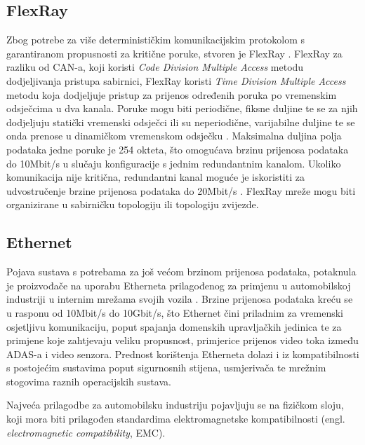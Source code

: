 \documentclass[times, utf8, diplomski, numeric]{fer}
\begin{document}
\subsection{FlexRay}
Zbog potrebe za više determinističkim komunikacijskim protokolom s garantiranom propusnosti za kritične poruke, stvoren je FlexRay \cite{nasser2023automotive}. FlexRay za razliku od CAN-a, koji koristi \textit{Code Division Multiple Access} metodu dodjeljivanja pristupa sabirnici, FlexRay koristi \textit{Time Division Multiple Access} metodu koja dodjeljuje pristup za prijenos određenih poruka po vremenskim odsječcima u dva kanala. Poruke mogu biti periodične, fiksne duljine te se za njih dodjeljuju statički vremenski odsječci ili su neperiodične, varijabilne duljine te se onda prenose u dinamičkom vremenskom odsječku \cite{nasser2023automotive}. Maksimalna duljina polja podataka jedne poruke je 254 okteta, što omogućava brzinu prijenosa podataka do 10Mbit/s u slučaju konfiguracije s jednim redundantnim kanalom. Ukoliko komunikacija nije kritična, redundantni kanal moguće je iskoristiti za udvostručenje brzine prijenosa podataka do 20Mbit/s \cite{nasser2023automotive, bosch2022handbook}. FlexRay mreže mogu biti organizirane u sabirničku topologiju ili topologiju zvijezde.
\subsection{Ethernet}
Pojava sustava s potrebama za još većom brzinom prijenosa podataka, potaknula je proizvođače na uporabu Etherneta prilagođenog za primjenu u automobilskoj industriji  u internim mrežama svojih vozila \cite{nasser2023automotive, bosch2022handbook}. Brzine prijenosa podataka kreću se u rasponu od 10Mbit/s do 10Gbit/s, što Ethernet čini priladnim za vremenski osjetljivu komunikaciju, poput spajanja domenskih upravljačkih jedinica te za primjene koje zahtjevaju veliku propusnost, primjerice prijenos video toka između ADAS-a i video senzora. Prednost korištenja Etherneta dolazi i iz kompatibilnosti s postojećim sustavima poput sigurnosnih stijena, usmjerivača te mrežnim stogovima raznih operacijskih sustava.  

Najveća prilagodbe za automobilsku industriju pojavljuju se na fizičkom sloju, koji mora biti prilagođen standardima elektromagnetske kompatibilnosti (engl. \textit{electromagnetic compatibility}, EMC).
\end{document}

